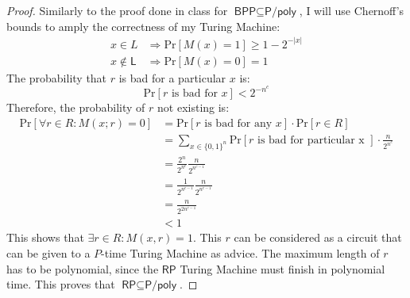 \documentclass[letterpaper,11pt]{article}
\newcommand{\cc}[1]{\ensuremath{\textsf{#1}}\xspace}
\renewcommand{\L}{\cc{L}}
\newcommand{\Ppoly}{\cc{P/poly}}
\newcommand{\BPP}{\cc{BPP}}
\newcommand{\RP}{\cc{RP}}
\newcommand{\Prob}{\mbox{Pr}}
\newcommand{\tm}{Turing Machine}
\begin{document}
\begin{proof}
Similarly to the proof done in class for $\BPP \subseteq \Ppoly$, I will use Chernoff's bounds to amply the correctness of my \tm{}:
\begin{align*}
	x \in L &\Rightarrow \Prob[M(x)=1] \geq 1-2^{-|x|} \\
	x \not \in \L &\Rightarrow \Prob[M(x) = 0] = 1
\end{align*}
%
The probability that $r$ is bad for a particular $x$ is:
\[
	\Prob[r \mbox{ is bad for } x] < 2^{-n^c}
\]
%
Therefore, the probability of $r$ not existing is:
%
\begin{align*}
	\Prob [\forall r \in R : M(x;r) = 0] &= \Prob[r \mbox{ is bad for any } x] \cdot \Prob[r \in R] \\
		&= \sum_{x \in \{0,1\}^n} \Prob[r \mbox{ is bad for particular x }] \cdot \frac{n}{2^{n^c}} \\
		&= \frac{2^n}{2^{n^c}} \frac{n}{2^{n^{c-1}}} \\
		&= \frac{1}{2^{n^{c-1}}} \frac{n}{2^{n^{c-1}}} \\
		&= \frac{n}{2^{2n^{c-1}}} \\
		&< 1
\end{align*}
This shows that $\exists r \in R: M(x,r) = 1$.
This $r$ can be considered as a circuit that can be given to a $P$-time \tm{} as advice.
The maximum length of $r$ has to be polynomial, since the $\RP$ \tm{} must finish in polynomial time.
This proves that $\RP \subseteq \Ppoly$.
\end{proof}
\end{document}
